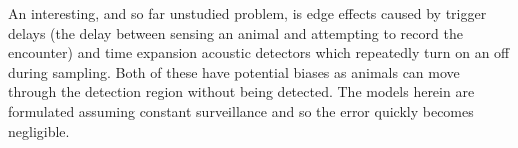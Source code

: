 \documentclass[a4paper,10pt,reqno,oneside]{amsart}
\begin{document}
An interesting, and so far unstudied problem, is edge effects caused by trigger delays (the delay between sensing an animal and attempting to record the encounter) and time expansion acoustic detectors which repeatedly turn on an off during sampling. Both of these have potential biases as animals can move through the detection region without being detected. The models herein are formulated assuming constant surveillance and so the error quickly becomes negligible.

	
	
\end{document}
